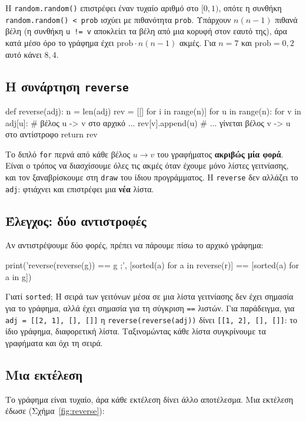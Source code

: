 \documentclass[11pt,a4paper]{article}
\newcommand{\code}[1]{\texttt{#1}}
\renewcommand{\_}{\textunderscore\allowbreak}
\begin{document}
Η \code{random.random()} επιστρέφει έναν τυχαίο αριθμό στο $[0, 1)$, οπότε η συνθήκη
\code{random.random() < prob} ισχύει με πιθανότητα \code{prob}. Υπάρχουν $n(n-1)$ πιθανά βέλη (η
συνθήκη \code{u != v} αποκλείει τα βέλη από μια κορυφή στον εαυτό της), άρα κατά μέσο όρο το γράφημα
έχει $\text{prob} \cdot n(n-1)$ ακμές. Για $n = 7$ και $\text{prob} = 0{,}2$ αυτό κάνει $8{,}4$.

\subsection{Η συνάρτηση \code{reverse}}
\begin{Piton}
def reverse(adj):
    n = len(adj)
    rev = [[] for i in range(n)]
    for u in range(n):
        for v in adj[u]:          # βέλος u -> v στο αρχικό ...
            rev[v].append(u)      # ... γίνεται βέλος v -> u στο αντίστροφο
    return rev
\end{Piton}

Το διπλό \code{for} περνά από κάθε βέλος $u \to v$ του γραφήματος \textbf{ακριβώς μία φορά}. Είναι ο
τρόπος να διασχίσουμε όλες τις ακμές όταν έχουμε μόνο λίστες γειτνίασης, και τον ξαναβρίσκουμε στη
\code{draw} του ίδιου προγράμματος. Η \code{reverse} δεν αλλάζει το \code{adj}: φτιάχνει και
επιστρέφει μια \textbf{νέα} λίστα.

\subsection{Έλεγχος: δύο αντιστροφές}
Αν αντιστρέψουμε δύο φορές, πρέπει να πάρουμε πίσω το αρχικό γράφημα:
\begin{Piton}
print('reverse(reverse(g)) == g ;',
      [sorted(a) for a in reverse(r)] == [sorted(a) for a in g])
\end{Piton}

Γιατί \code{sorted}; Η σειρά των γειτόνων μέσα σε μια λίστα γειτνίασης δεν έχει σημασία για το
γράφημα, αλλά έχει σημασία για τη σύγκριση \code{==} λιστών. Για παράδειγμα, για
\code{adj = [[2, 1], [], []]} η \code{reverse(reverse(adj))} δίνει \code{[[1, 2], [], []]}: το ίδιο
γράφημα, διαφορετική λίστα. Ταξινομώντας κάθε λίστα συγκρίνουμε τα γραφήματα και όχι τη σειρά.

\subsection{Μια εκτέλεση}
Το γράφημα είναι τυχαίο, άρα κάθε εκτέλεση δίνει άλλο αποτέλεσμα. Μια εκτέλεση έδωσε
(Σχήμα~\ref{fig:reverse}):
\end{document}
